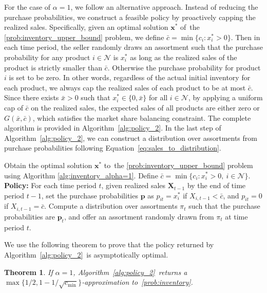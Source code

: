 \documentclass[mnsc,non-blindrev]{informs3}
\newtheorem{theorem}{Theorem}[section]
\theoremstyle{definition}
\begin{document}
\begin{appendices}{\Large{}}
For the case of $\alpha=1$, we follow an alternative approach. Instead of reducing the purchase probabilities, we construct a feasible policy by proactively capping the realized sales. Specifically, given an optimal solution $\bm{x}^*$ of~the \ref{prob:inventory_upper_bound} problem, we define $\bar{c}=\min\{c_i:x^*_i>0\}$. Then in each time period, the seller randomly draws an assortment such that the purchase probability for any product $i\in\mathcal{N}$ is $x^*_i$ as long as the realized sales of the product is strictly smaller than $\bar{c}$. Otherwise the purchase probability for product $i$ is set to be zero. In other words, regardless of the actual initial inventory for each product, we always cap the realized sales of each product to be at most $\bar{c}$. Since there exists $\bar{x}>0$ such that $x_i^*\in\{0,\bar{x}\}$ for all $i\in\mathcal{N}$, by applying a uniform cap of $\bar{c}$ on the realized sales, the expected sales of all products are either zero or $G(\bar{x},\bar{c})$, which satisfies the market share balancing constraint. The complete algorithm is provided in Algorithm~\ref{alg:policy_2}. In the last step of Algorithm~\ref{alg:policy_2}, we can construct a distribution over assortments from purchase probabilities following Equation~\eqref{eq:sales_to_distribution}.

\begin{algorithm}[t]
\SingleSpacedXI
\caption{Asymptotically Optimal Policy for \ref{prob:inventory} when $\alpha=1$}
\label{alg:policy_2}
\begin{algorithmic}
\State Obtain the optimal solution $\bm{x}^*$ to~the \ref{prob:inventory_upper_bound} problem using Algorithm \ref{alg:inventory_alpha=1}.
\State Define $\bar{c}=\min\{c_i:x^*_i>0,\ i\in\mathcal{N}\}$.
\State \textbf{Policy:} For each time period $t$, given realized sales $\bm{X}_{t-1}$ by the end of time period $t-1$, set the purchase probabilities $\bm{p}$ as $p_{it}=x^*_i$ if $X_{i,t-1}<\bar{c}$, and $p_{it}=0$ if $X_{i,t-1}=\bar{c}$. Compute a distribution over assortments $\pi_t$ such that the purchase probabilities are $\bm{p}_t$, and offer an assortment randomly drawn from $\pi_t$ at time period $t$.
\end{algorithmic}
\end{algorithm}

We use the following theorem to prove that the policy returned by Algorithm~\ref{alg:policy_2}~is asymptotically optimal.

\begin{theorem}\label{thm:inventory_constant_2}
If $\alpha=1$, Algorithm~\ref{alg:policy_2}~returns a $\max\{{1}/{2},1-{1}/{\sqrt{c_{\min}}}\}$-approximation to~\ref{prob:inventory}.
\end{theorem}


\end{appendices}
\end{document}
